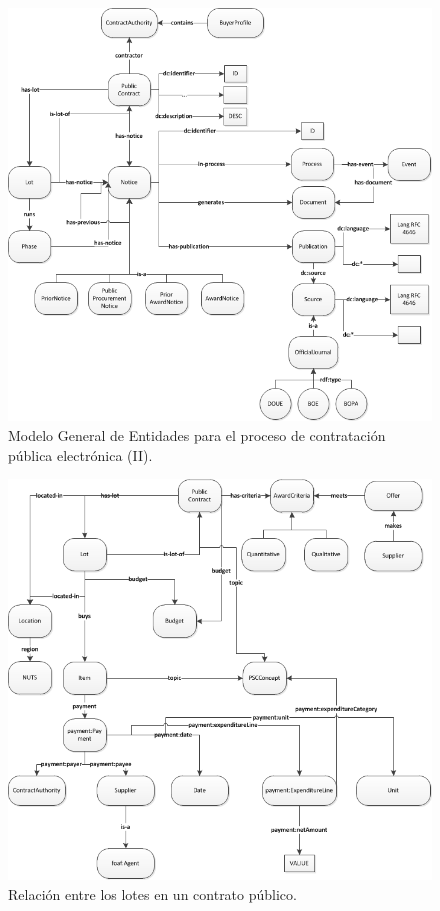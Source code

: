 \begin{figure}[!htp]
    \centering
	\includegraphics[width=16cm]{images/phd/modelo/overview}
	\caption{Modelo General de Entidades para el proceso de contratación pública electrónica (II).}
	\label{fig:modelo-ppn-1}
\end{figure}

\begin{figure}[!htp]
    \centering
	\includegraphics[width=16cm]{images/phd/modelo/contract-lots}
	\caption{Relación entre los lotes en un contrato público.}
	\label{fig:modelo-contract-lots}
\end{figure}



